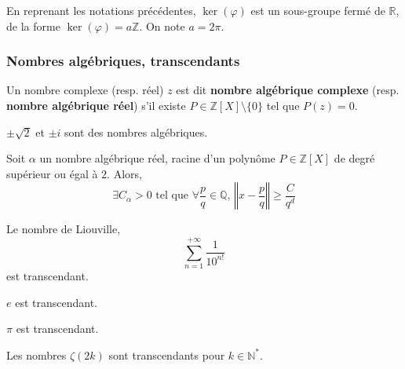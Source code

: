   \begin{proposition}
    En reprenant les notations précédentes, $\ker(\varphi)$ est un sous-groupe fermé de $\mathbb{R}$, de la forme $\ker(\varphi) = a\mathbb{Z}$. On note $a = 2\pi$.
  \end{proposition}

  \subsubsection{Nombres algébriques, transcendants}


  \begin{definition}
    Un nombre complexe (resp. réel) $z$ est dit \textbf{nombre algébrique complexe} (resp. \textbf{nombre algébrique réel}) s'il existe $P \in \mathbb{Z}[X] \setminus \{ 0 \}$ tel que $P(z) = 0$.
  \end{definition}


  \begin{example}
    $\pm \sqrt{2}$ et $\pm i$ sont des nombres algébriques.
  \end{example}


  \begin{theorem}
    Soit $\alpha$ un nombre algébrique réel, racine d'un polynôme $P \in \mathbb{Z}[X]$ de degré supérieur ou égal à $2$. Alors,
    \[ \exists C_\alpha > 0 \text{ tel que } \forall \frac{p}{q} \in \mathbb{Q}, \, \left\Vert x - \frac{p}{q} \right\Vert \geq \frac{C}{q^d} \]
  \end{theorem}

  \begin{application}
    Le nombre de Liouville,
    \[ \sum_{n=1}^{+\infty} \frac{1}{10^{n!}} \]
    est transcendant.
  \end{application}


  \begin{theorem}
    $e$ est transcendant.
  \end{theorem}

  \begin{theorem}
    $\pi$ est transcendant.
  \end{theorem}


  \begin{application}
    Les nombres $\zeta(2k)$ sont transcendants pour $k \in \mathbb{N}^*$.
  \end{application}

